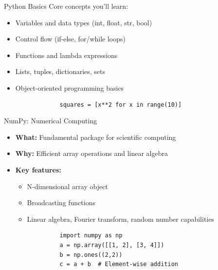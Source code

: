 \documentclass{beamer}
\begin{document}
	\begin{frame}[fragile]{Python Basics}
		Core concepts you'll learn:
		\begin{itemize}
			\item Variables and data types (int, float, str, bool)
			\item Control flow (if-else, for/while loops)
			\item Functions and lambda expressions
			\item Lists, tuples, dictionaries, sets
			\item Object-oriented programming basics
		\end{itemize}
		
		\begin{example}
			\begin{lstlisting}
				squares = [x**2 for x in range(10)]
			\end{lstlisting}
		\end{example}
	\end{frame}
	
	\begin{frame}[fragile]{NumPy: Numerical Computing}
		\begin{itemize}
			\item \textbf{What:} Fundamental package for scientific computing
			\item \textbf{Why:} Efficient array operations and linear algebra
			\item \textbf{Key features:}
			\begin{itemize}
				\item N-dimensional array object
				\item Broadcasting functions
				\item Linear algebra, Fourier transform, random number capabilities
			\end{itemize}
		\end{itemize}
		
		\begin{example}
			\begin{lstlisting}
				import numpy as np
				a = np.array([[1, 2], [3, 4]])
				b = np.ones((2,2))
				c = a + b  # Element-wise addition
			\end{lstlisting}
		\end{example}
	\end{frame}
	
\end{document}
